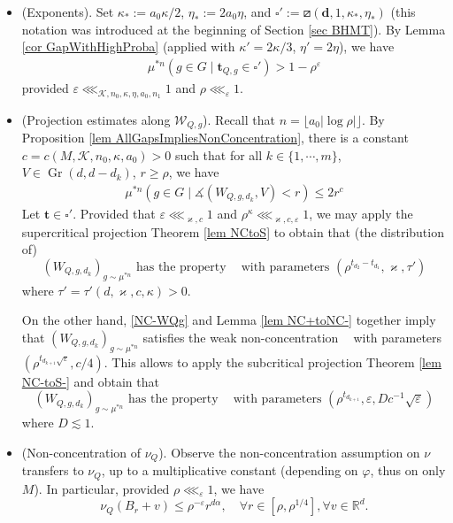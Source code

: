 \documentclass[11pt, leqno, fleqn]{amsart}
\def\cW{\mathcal W}
\def\eps{\varepsilon}
\newcommand{\margem}[1]{\marginpar{{\scriptsize {#1}}}}
\def\clo{   \color{orange}}
\def\bt{        \mathbf{t}}
\def \R{{\mathbb R}}
\newcommand{\bd}{\mathbf{d}}
\DeclareMathOperator{\Gr}{Gr}
\DeclareMathOperator{\SubP}{(S^{-})}
\DeclareMathOperator{\SupP}{(S^+)}
\DeclareMathOperator{\NCSub}{(NC^{-})}
\newcommand{\increasing}{\boxslash}         %
\newcommand{\cK}{{\mathcal K}}
\newcommand{\ary}{\begin{eqnarray}}
\newcommand{\eary}{\end{eqnarray}}
\newcommand{\aryst}{\begin{eqnarray*}}
\newcommand{\earyst}{\end{eqnarray*}}
\theoremstyle{definition}
\theoremstyle{definition}
\begin{document}
\begin{itemize}
\item (Exponents).	
Set $\kappa_{*}:=a_{0}\kappa/2$, $\eta_{*}:=2a_{0}\eta$,  and $\square':=\increasing(\bd, 1, \kappa_{*}, \eta_{*})$   (this notation was introduced at the beginning of Section \ref{sec BHMT}).  By Lemma \ref{cor GapWithHighProba} (applied with $\kappa'=2\kappa/3$, $\eta'=2\eta$),  we have  
   \aryst \label{eq ComplementOmegajnkappa}
    \mu^{* n}(  g \in G \mid \bt_{Q,g}\in \square'  )    > 1 - \rho^{\eps}
   \earyst
   provided  $\eps \lll_{ \cK,n_{0}, \kappa, \eta, a_{0}, n_{1}} 1$ and $\rho\lll_{\eps }1$. 
\bigskip

\item (Projection estimates along $\cW_{Q, g}$). 
     Recall that $n = \lfloor a_{0} | \log \rho| \rfloor$.
 By Proposition \ref{lem AllGapsImpliesNonConcentration},  there is a constant $c=c(M, \cK, n_{0},\kappa, a_{0})>0$ such that for all $k \in \{1, \cdots, m\}$, $V \in \Gr(d, d- d_k)$, $r \geq \rho$, we have  
   \ary \label{NC-WQg}
   \mu^{* n}(  g \in G \mid  \measuredangle( W_{Q, g, d_k}, V ) <  r )    \leq 2   r^{c}   
   \eary
   Let $\bt\in \square'$. Provided that  $\eps \lll_{\varkappa, c}1$ and  $\rho^{\kappa}\lll_{\varkappa, c,\eps}1$, we may apply 
    the supercritical projection Theorem \ref{lem NCtoS} to obtain that (the distribution  of)   
   $$
   \text{$(W_{Q, g, d_k})_{g\sim \mu^{*n}}$ has  the property $\SupP$ with  parameters $(\rho^{t_{d_{2}} -t_{d_{1}}},  \varkappa, \tau')$}
    $$ 
   where $\tau'=\tau'(d, \varkappa, c, \kappa)>0$.
   
   On the other hand,   \eqref{NC-WQg} and Lemma \ref{lem NC+toNC-} together   imply that  $(W_{Q, g, d_k})_{g\sim \mu^{*n}}$ satisfies the weak  non-concentration $\NCSub$ with parameters $(  \rho^{ t_{d_{k+1}}\sqrt{\eps}}  , c/4)$.   This allows to apply the subcritical projection Theorem \ref{lem NC-toS-} and obtain that
$$\text{$(W_{Q, g, d_k})_{g \sim \mu^{*n}}$ has  the property $\SubP$ with  parameters $( \rho^{t_{d_{k+1}}},  \eps, D c^{-1} \sqrt{\eps} )$}$$
where $D\lesssim 1$. 


\bigskip

\item (Non-concentration of  $\nu_{Q}$). Observe the non-concentration assumption on $\nu$ transfers to $\nu_{Q}$, up to a multiplicative constant (depending  on $\varphi$, thus on only $M$). In particular, provided $\rho\lll_{\eps}1$, we have
$$				
 \nu_{Q}(B_{r} + v) \leq \rho^{-\eps}    r^{d\alpha}, \quad
\forall  r\in [\rho, \rho^{1/4}], \forall v \in \R^d.
$$
\end{itemize}	
\end{document}
